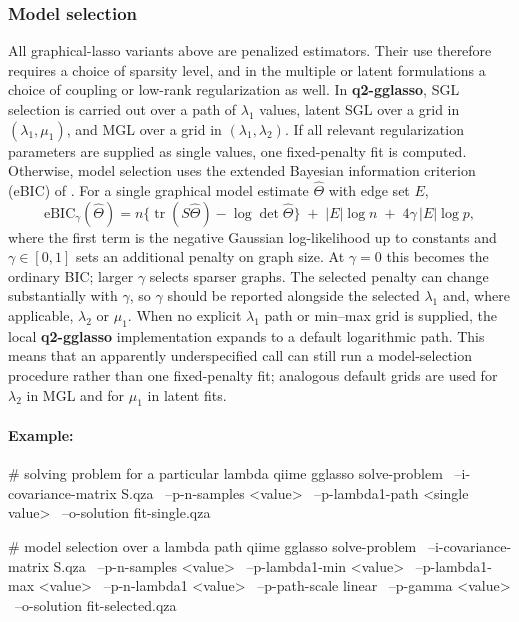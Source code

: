 \documentclass[11pt,a4paper]{article}
\newcommand{\pkg}[1]{\textbf{#1}}
\newcommand{\tr}{\operatorname{tr}}
\begin{document}
\subsubsection{Model selection}
\label{sec:gglasso-model-selection}
All graphical-lasso variants above are penalized estimators. Their use therefore
requires a choice of sparsity level, and in the multiple or latent formulations a
choice of coupling or low-rank regularization as well. In \pkg{q2-gglasso}, SGL
selection is carried out over a path of $\lambda_1$ values, latent SGL over a
grid in $(\lambda_1,\mu_1)$, and MGL over a grid in
$(\lambda_1,\lambda_2)$. If all relevant regularization parameters are supplied
as single values, one fixed-penalty fit is computed. Otherwise, model selection
uses the extended Bayesian information criterion (eBIC) of
\citet{foygel2010extended}. For a single graphical model estimate
$\widehat\Theta$ with edge set $E$,
\begin{equation}
\label{eq:ebic}
\mathrm{eBIC}_{\gamma}(\widehat\Theta)
= n\big\{\tr(S\widehat\Theta) - \log\det\widehat\Theta\big\}
\;+\; |E| \log n \;+\; 4\gamma\,|E| \log p ,
\end{equation}
where the first term is the negative Gaussian log-likelihood up to constants and
$\gamma \in [0,1]$ sets an additional penalty on graph size. At $\gamma = 0$ this
becomes the ordinary BIC; larger $\gamma$ selects sparser graphs. The selected
penalty can change substantially with $\gamma$, so $\gamma$ should be reported
alongside the selected $\lambda_1$ and, where applicable, $\lambda_2$ or $\mu_1$.
When no explicit $\lambda_1$ path or min--max grid is supplied, the local
\pkg{q2-gglasso} implementation expands to a default logarithmic path. This means
that an apparently underspecified call can still run a model-selection procedure
rather than one fixed-penalty fit; analogous default grids are used for
$\lambda_2$ in MGL and for $\mu_1$ in latent fits.

\paragraph{Example:} \mbox{}
\begin{PseudoCode}
# solving problem for a particular lambda
qiime gglasso solve-problem \
    --i-covariance-matrix S.qza \
    --p-n-samples <value> \
    --p-lambda1-path <single value> \
    --o-solution fit-single.qza

# model selection over a lambda path
qiime gglasso solve-problem \
    --i-covariance-matrix S.qza \
    --p-n-samples <value> \
    --p-lambda1-min <value> \
    --p-lambda1-max <value> \
    --p-n-lambda1 <value> \
    --p-path-scale linear \
    --p-gamma <value> \
    --o-solution fit-selected.qza
\end{PseudoCode}
\end{document}

